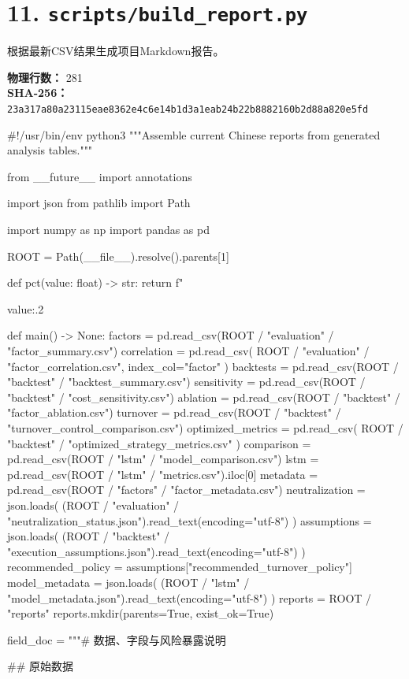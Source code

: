 \documentclass[UTF8,a4paper,fontset=fandol]{ctexart}
\begin{document}
\section{11. \texttt{scripts/build\_report.py}}
根据最新CSV结果生成项目Markdown报告。

\textbf{物理行数：} 281\\
\textbf{SHA-256：} \texttt{23a317a80a23115eae8362e4c6e14b1d3a1eab24b22b8882160b2d88a820e5fd}

\begin{ProjectCode}
#!/usr/bin/env python3
"""Assemble current Chinese reports from generated analysis tables."""

from __future__ import annotations

import json
from pathlib import Path

import numpy as np
import pandas as pd


ROOT = Path(__file__).resolve().parents[1]


def pct(value: float) -> str:
    return f"{value:.2%


def main() -> None:
    factors = pd.read_csv(ROOT / "evaluation" / "factor_summary.csv")
    correlation = pd.read_csv(
        ROOT / "evaluation" / "factor_correlation.csv", index_col="factor"
    )
    backtests = pd.read_csv(ROOT / "backtest" / "backtest_summary.csv")
    sensitivity = pd.read_csv(ROOT / "backtest" / "cost_sensitivity.csv")
    ablation = pd.read_csv(ROOT / "backtest" / "factor_ablation.csv")
    turnover = pd.read_csv(ROOT / "backtest" / "turnover_control_comparison.csv")
    optimized_metrics = pd.read_csv(
        ROOT / "backtest" / "optimized_strategy_metrics.csv"
    )
    comparison = pd.read_csv(ROOT / "lstm" / "model_comparison.csv")
    lstm = pd.read_csv(ROOT / "lstm" / "metrics.csv").iloc[0]
    metadata = pd.read_csv(ROOT / "factors" / "factor_metadata.csv")
    neutralization = json.loads(
        (ROOT / "evaluation" / "neutralization_status.json").read_text(encoding="utf-8")
    )
    assumptions = json.loads(
        (ROOT / "backtest" / "execution_assumptions.json").read_text(encoding="utf-8")
    )
    recommended_policy = assumptions["recommended_turnover_policy"]
    model_metadata = json.loads(
        (ROOT / "lstm" / "model_metadata.json").read_text(encoding="utf-8")
    )
    reports = ROOT / "reports"
    reports.mkdir(parents=True, exist_ok=True)

    field_doc = """# 数据、字段与风险暴露说明

## 原始数据

}
\end{ProjectCode}
\end{document}
